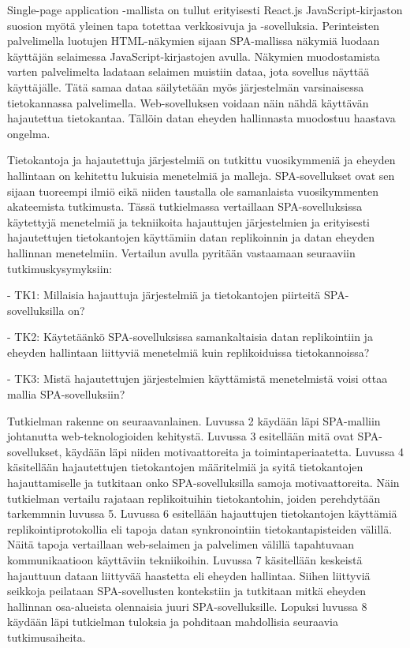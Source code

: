 \documentclass[finnish,twoside,censored,csm,sw-track-2018]{HYthesisML}
\begin{document}
Single-page application -mallista on tullut erityisesti React.js JavaScript-kirjaston suosion myötä yleinen tapa totettaa verkkosivuja ja -sovelluksia. Perinteisten palvelimella luotujen HTML-näkymien sijaan SPA-mallissa näkymiä luodaan käyttäjän selaimessa JavaScript-kirjastojen avulla. Näkymien muodostamista varten palvelimelta ladataan selaimen muistiin dataa, jota sovellus näyttää käyttäjälle. Tätä samaa dataa säilytetään myös järjestelmän varsinaisessa tietokannassa palvelimella. Web-sovelluksen voidaan näin nähdä käyttävän hajautettua tietokantaa. Tällöin datan eheyden hallinnasta muodostuu haastava ongelma. 

Tietokantoja ja hajautettuja järjestelmiä on tutkittu vuosikymmeniä ja eheyden hallintaan on kehitettu lukuisia menetelmiä ja malleja. SPA-sovellukset ovat sen sijaan tuoreempi ilmiö eikä niiden taustalla ole samanlaista vuosikymmenten akateemista tutkimusta. Tässä tutkielmassa vertaillaan SPA-sovelluksissa käytettyjä menetelmiä ja tekniikoita hajauttujen järjestelmien ja erityisesti hajautettujen tietokantojen käyttämiin datan replikoinnin ja datan eheyden hallinnan menetelmiin. Vertailun avulla pyritään vastaamaan seuraaviin tutkimuskysymyksiin:

- TK1: Millaisia hajauttuja järjestelmiä ja tietokantojen piirteitä SPA-sovelluksilla on?

- TK2: Käytetäänkö SPA-sovelluksissa samankaltaisia datan replikointiin ja eheyden hallintaan liittyviä menetelmiä kuin replikoiduissa tietokannoissa?

- TK3: Mistä hajautettujen järjestelmien käyttämistä menetelmistä voisi ottaa mallia SPA-sovelluksiin?

Tutkielman rakenne on seuraavanlainen. Luvussa 2 käydään läpi SPA-malliin johtanutta web-teknologioiden kehitystä. Luvussa 3 esitellään mitä ovat SPA-sovellukset, käydään läpi niiden motivaattoreita ja toimintaperiaatetta. Luvussa 4 käsitellään hajautettujen tietokantojen määritelmiä ja syitä tietokantojen hajauttamiselle ja tutkitaan onko SPA-sovelluksilla samoja motivaattoreita. Näin tutkielman vertailu rajataan replikoituihin tietokantohin, joiden perehdytään tarkemmnin luvussa 5. Luvussa 6 esitellään hajauttujen tietokantojen käyttämiä replikointiprotokollia eli tapoja datan synkronointiin tietokantapisteiden välillä. Näitä tapoja vertaillaan web-selaimen ja palvelimen välillä tapahtuvaan kommunikaatioon käyttäviin tekniikoihin. Luvussa 7 käsitellään keskeistä hajauttuun dataan liittyvää haastetta eli eheyden hallintaa. Siihen liittyviä seikkoja peilataan SPA-sovellusten kontekstiin ja tutkitaan mitkä eheyden hallinnan osa-alueista olennaisia juuri SPA-sovelluksille. Lopuksi luvussa 8 käydään läpi tutkielman tuloksia ja pohditaan mahdollisia seuraavia tutkimusaiheita.
\end{document}

